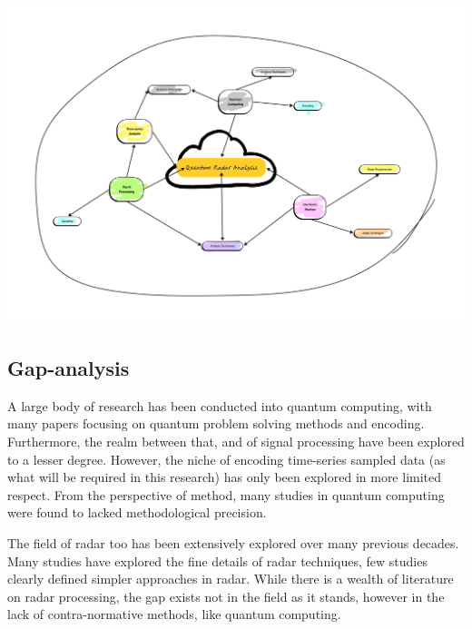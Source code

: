 \includegraphics[width=1\textwidth]{Figures/Literature review - mind map.png}

\subsection{Gap-analysis}

A large body of research has been conducted into quantum computing, with many papers focusing on quantum problem solving methods and encoding.
Furthermore, the realm between that, and of signal processing have been explored to a lesser degree.
However, the niche of encoding time-series sampled data (as what will be required in this research) has only been explored in more limited respect.
From the perspective of method, many studies in quantum computing were found to lacked methodological precision.

The field of radar too has been extensively explored over many previous decades.
Many studies have explored the fine details of radar techniques, few studies clearly defined simpler approaches in radar.
While there is a wealth of literature on radar processing, the gap exists not in the field as it stands, however in the lack of contra-normative methods, like quantum computing.

